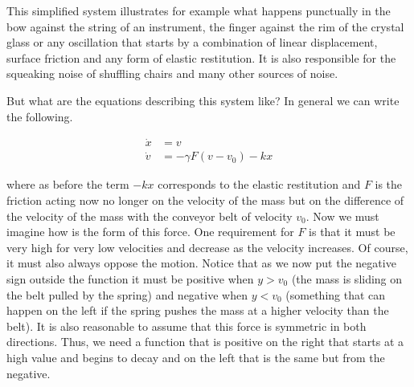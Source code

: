\documentclass{article}
\begin{document}
\begin{figure}[h]
    \centering
    \caption{} 
    \label{fig_belt}
\end{figure}

This simplified system illustrates for example what happens punctually in the bow against the string of an instrument, the finger against the rim of the crystal glass or any oscillation that starts by a combination of linear displacement, surface friction and any form of elastic restitution. 
It is also responsible for the squeaking noise of shuffling chairs and many other sources of noise. 

But what are the equations describing this system like? 
In general we can write the following. 


\begin{subequations} \label{eq_bow}
\begin{align}
    \dot{x} & = v \\
    \dot{v} & = - \gamma F(v-v_0) - kx
\end{align}
\end{subequations}

where as before the term $-kx$ corresponds to the elastic restitution and $F$ is the friction acting now no longer on the velocity of the mass but on the difference of the velocity of the mass with the conveyor belt of velocity $v_0$. 
Now we must imagine how is the form of this force. 
One requirement for $F$ is that it must be very high for very low velocities and decrease as the velocity increases. 
Of course, it must also always oppose the motion. 
Notice that as we now put the negative sign outside the function it must be positive when $y>v_0$ (the mass is sliding on the belt pulled by the spring) and negative when $y<v_0$ (something that can happen on the left if the spring pushes the mass at a higher velocity than the belt). 
It is also reasonable to assume that this force is symmetric in both directions. 
Thus, we need a function that is positive on the right that starts at a high value and begins to decay and on the left that is the same but from the negative. 
\end{document}

